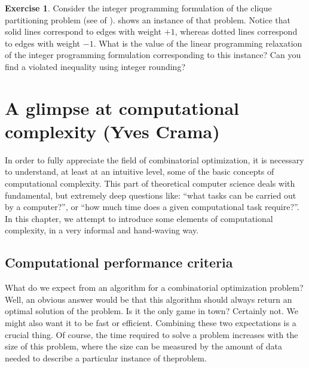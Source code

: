 \documentclass[titlepage]{book}
\theoremstyle{plain}
\theoremstyle{definition}
\newtheorem{exercise}{Exercise}[chapter]
\theoremstyle{remark}
\begin{document}
\begin{exercise}
Consider the integer programming formulation of the clique partitioning problem (see  of ).  shows an instance of that problem. Notice that solid lines correspond to edges with weight $+1$, whereas dotted lines correspond to edges with weight $-1$. What is the value of the linear programming relaxation of the integer programming formulation corresponding to this instance? Can you find a violated inequality using integer rounding?
\end{exercise}

\chapter{A glimpse at computational complexity (Yves Crama)}
In order to fully appreciate the field of combinatorial optimization, it is necessary to understand, at least at an intuitive level, some of the basic concepts of computational complexity. This part of theoretical computer science deals with fundamental, but extremely deep questions like: ``what tasks can be carried out by a computer?'', or ``how much time does a given computational task require?''. In this chapter, we attempt to introduce some elements of computational complexity, in a very informal and hand-waving way.

\section{Computational performance criteria}
What do we expect from an algorithm for a combinatorial optimization problem? Well, an obvious answer would be that this algorithm should always return an optimal solution of the problem. Is it the only game in town? Certainly not. We might also want it to be fast or efficient. Combining these two expectations is a crucial thing. Of course, the time required to solve a problem increases with the size of this problem,  where the size can be measured by the amount of data needed to describe a particular instance of theproblem.
\end{document}
